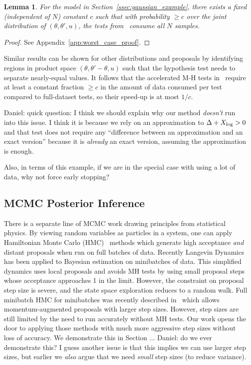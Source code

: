 \documentclass{article}
\newtheorem{lemma}{Lemma}
\begin{document}
\begin{lemma}\label{lem:worst_case}
    For the model in Section~\ref{ssec:gaussian_example}, there exists a fixed
    (independent of $N$) constant $c$ such that with probability $\geq c$ over
    the joint distribution of $(\theta, \theta', u)$, the tests
    from~\cite{cutting_mh_2014,icml2014c1_bardenet14} consume all $N$ samples. 
\end{lemma}

\begin{proof}
See Appendix~\ref{app:worst_case_proof}.
\end{proof}

Similar results can be shown for other distributions and proposals by
identifying regions in product space $(\theta,\theta'-\theta,u)$ such that the
hypothesis test needs to separate nearly-equal values.  It follows that the
accelerated M-H tests in~\cite{cutting_mh_2014,icml2014c1_bardenet14} require at
least a constant fraction $\geq c$ in the amount of data consumed per test
compared to full-dataset tests, so their speed-up is at most $1/c$.

{\color{blue} Daniel: quick question: I think we should explain why our method
\emph{doesn't} run into this issue. I think it is because we rely on an
approximation to $\Delta + X_{\rm log} > 0$ and that test does not require any
``difference between an approximation and an exact version'' because it is
\emph{already} an exact version, assuming the approximation is enough.

Also, in terms of this example, if we are in the special case with using a lot
of data, why not force early stopping?}

\subsection{MCMC Posterior Inference}
There is a separate line of MCMC work drawing principles from statistical
physics. By viewing random variables as particles in a system, one can apply
Hamiltonian Monte Carlo (HMC)~\cite{mcmc_hamiltonian_2010} methods which
generate high acceptance \emph{and} distant proposals when run on full batches
of data. Recently Langevin Dynamics~\cite{langevin_2011,conf/icml/AhnBW12} has
been applied to Bayesian estimation on minibatches of data. This simplified
dynamics uses local proposals and avoids MH tests by using small proposal steps
whose acceptance approaches 1 in the limit. However, the constraint on proposal
step size is severe, and the state space exploration reduces to a random walk.
Full minibatch HMC for minibatches was recently described in~\cite{sghmc_2014}
which allows momentum-augmented proposals with larger step sizes. However, step
sizes are still limited by the need to run accurately without MH tests.  Our
work opens the door to applying those methods with much more aggressive step
sizes without loss of accuracy. We demonstrate this in Section ... {\color{blue}
Daniel: do we ever demonstrate this? I guess another issue is that this implies
we can use larger step sizes, but earlier we \emph{also} argue that we need
\emph{small} step sizes (to reduce variance).}
\end{document}
